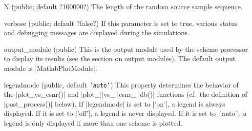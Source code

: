 \begin{property}{N (public; default ?100000?)}
  The length of the random source sample sequence.
\end{property}
  
\begin{property}{verbose (public; default ?false?)}
  If this parameter is set to true, various status and debugging messages are
  displayed during the simulations.
\end{property}

\begin{property}{output_module (public)}
  This is the output module used by the scheme processor to display its
  results (see the section on output modules). The default output module is
  |MatlabPlotModule|.
\end{property}

\begin{property}{legendmode (public, default \texttt{'auto'})}
  This property determines the behavior of the |plot_vs_csnr()| and
  |plot_|\-|vs_|\-|csnr_|\-|db()| functions (cf.~the definition of |post_process()| below).
  If |legendmode| is set to |'on'|, a legend is always displayed. If it is set
  to |'off'|, a legend is never displayed. If it is set to |'auto'|, a legend is
  only displayed if more than one scheme is plotted.
\end{property}

